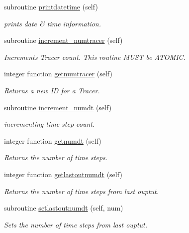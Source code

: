 \begin{DoxyCompactItemize}
subroutine \mbox{\hyperlink{namespacesimulationglobals__mod_abd0e28a5ec7733d0292dd8e631e96577}{printdatetime}} (self)
\begin{DoxyCompactList}\small\item\em prints date \& time information. \end{DoxyCompactList}\item 
subroutine \mbox{\hyperlink{namespacesimulationglobals__mod_a3f11ed9f7735018950e1921ead871269}{increment\+\_\+numtracer}} (self)
\begin{DoxyCompactList}\small\item\em Increments Tracer count. This routine M\+U\+ST be A\+T\+O\+M\+IC. \end{DoxyCompactList}\item 
integer function \mbox{\hyperlink{namespacesimulationglobals__mod_ac4915156236196940b31ff02d53af295}{getnumtracer}} (self)
\begin{DoxyCompactList}\small\item\em Returns a new ID for a Tracer. \end{DoxyCompactList}\item 
subroutine \mbox{\hyperlink{namespacesimulationglobals__mod_ad983ee8885b275c6fa1369f1e158e078}{increment\+\_\+numdt}} (self)
\begin{DoxyCompactList}\small\item\em incrementing time step count. \end{DoxyCompactList}\item 
integer function \mbox{\hyperlink{namespacesimulationglobals__mod_af313959d6cbfc4cb0ab330aa094511c5}{getnumdt}} (self)
\begin{DoxyCompactList}\small\item\em Returns the number of time steps. \end{DoxyCompactList}\item 
integer function \mbox{\hyperlink{namespacesimulationglobals__mod_ac643661b27d17726e0305e34370de5c3}{getlastoutnumdt}} (self)
\begin{DoxyCompactList}\small\item\em Returns the number of time steps from last ouptut. \end{DoxyCompactList}\item 
subroutine \mbox{\hyperlink{namespacesimulationglobals__mod_ab760ab6064743ff54237166301346616}{setlastoutnumdt}} (self, num)
\begin{DoxyCompactList}\small\item\em Sets the number of time steps from last ouptut. \end{DoxyCompactList}\item 

\end{DoxyCompactItemize}
